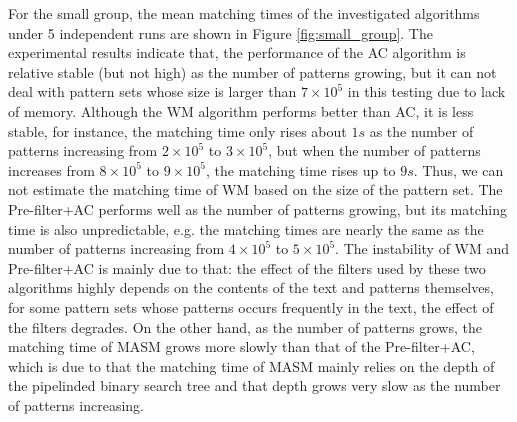 \documentclass{article}
\begin{document}
For the small group, the mean matching times of the investigated
algorithms under 5 independent runs are shown in Figure
\ref{fig:small_group}. The experimental results indicate that, the
performance of the \textsf{AC} algorithm is relative stable (but not
high) as the number of patterns growing, but it can not deal with
pattern sets whose size is larger than $7 \times 10^5$ in this testing
due to lack of memory. Although the \textsf{WM} algorithm performs
better than \textsf{AC}, it is less stable, for instance, the matching
time only rises about $1s$ as the number of patterns increasing from
$2 \times 10^5$ to $3 \times 10^5$, but when the number of patterns
increases from $8 \times 10^5$ to $9 \times 10^5$, the matching time
rises up to $9s$. Thus, we can not estimate the matching time of
\textsf{WM} based on the size of the pattern set. The
\textsf{Pre-filter+AC} performs well as the number of patterns
growing, but its matching time is also unpredictable, e.g. the
matching times are nearly the same as the number of patterns
increasing from $4 \times 10^5$ to $5 \times 10^5$. The instability of
\textsf{WM} and \textsf{Pre-filter+AC} is mainly due to that: the
effect of the filters used by these two algorithms highly depends on
the contents of the text and patterns themselves, for some pattern
sets whose patterns occurs frequently in the text, the effect of the
filters degrades. On the other hand, as the number of patterns grows,
the matching time of \textsf{MASM} grows more slowly than that of the
\textsf{Pre-filter+AC}, which is due to that the matching time of
\textsf{MASM} mainly relies on the depth of the pipelinded binary
search tree and that depth grows very slow as the number of patterns
increasing.

\end{document}

